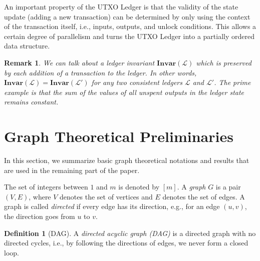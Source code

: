 \documentclass[11pt]{article}
\newcommand{\Invar}{\mathbf{Invar}}
\newcommand{\ledger}{\mathcal{L}}
\theoremstyle{plain}
\newtheorem{remark}{Remark}
\theoremstyle{definition}
\newtheorem{definition}{Definition}
\numberwithin{definition}{section}
\numberwithin{lemma}{section}
\numberwithin{ass}{section}
\numberwithin{remark}{section}
\numberwithin{example}{section}
\numberwithin{proposition}{section}
\numberwithin{theorem}{section}
\begin{document}
An important property of the UTXO Ledger is that the validity of the state update (adding a new transaction) can be determined  by only using the context of the transaction itself, i.e., inputs, outputs, and unlock conditions. This allows a certain degree of parallelism and turns the UTXO Ledger into a partially ordered data structure. 


\begin{remark}\label{rem: invariant ledger}
We can talk about a ledger invariant $\Invar(\ledger)$ which is preserved by each addition of a transaction to the ledger. In other words, $\Invar(\ledger)=\Invar(\ledger')$ for any two consistent ledgers $\ledger$ and $\ledger'$.  The prime example is that the sum of the values of all unspent outputs in the ledger state remains constant.
\end{remark}


\section{Graph Theoretical Preliminaries}\label{sec: graph-theoretical notions}

In this section, we summarize basic graph theoretical notations and results that are used in the remaining part of the paper.

The set of integers between $1$ and $m$ is denoted by $[m]$. A \emph{graph} ${G}$ is a pair $(V,E)$, where $V$ denotes the set of vertices and $E$ denotes the set of edges. A graph is called \emph{directed} if every edge has its direction, e.g.,  for an edge $(u,v)$, the direction goes from $u$ to $v$. 

\begin{definition}[DAG]
A \emph{directed acyclic graph (DAG)} is a directed graph with no directed cycles, i.e.,  by following the directions of edges, we never form a closed loop.
\end{definition}
\end{document}
